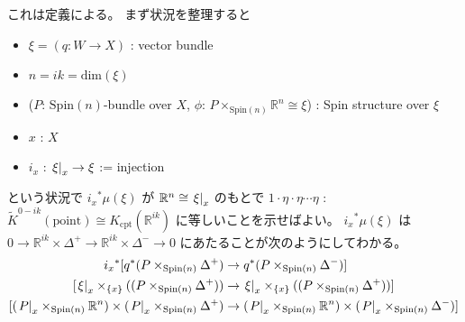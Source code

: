 \documentclass[dvipdfmx]{jsarticle}
\newcommand{\KtheoryCpxRel}[2]{K_{\mathbb{K},cpt}(#1, #2)}
\begin{document}
\begin{Proof}
\itemprof
  これは定義による。
\itemprof
  まず状況を整理すると
  \begin{itemize}
    \item \(\xi = (q : W \to X)\) : vector bundle
    \item \(n = ik = \text{dim}(\xi)\)
    \item (\(P\): \(\text{Spin}(n)\)-bundle over \(X\), \(\phi\): \(P \times_{\text{Spin}(n)} \mathbb{R}^n \cong \xi\)) : Spin structure over \(\xi\)
    \item \(x\) : \(X\)
    \item \(i_x\) : \(\left. {\xi} \right| _{x} \to \xi\) := injection
  \end{itemize}
  という状況で
  \({i_x}^*\mu(\xi)\) が \(\mathbb{R}^n \cong \left. {\xi} \right| _{x}\) のもとで \(1 \cdot \eta \cdot \eta \cdots \eta\) : \(\tilde{K}^{0 - ik}(\text{point}) \cong K_{\text{cpt}}(\mathbb{R}^{ik})\)
  に等しいことを示せばよい。
  \({i_x}^*\mu(\xi)\) は　\(0 \to \mathbb{R}^{ik} \times \Delta^+ \to \mathbb{R}^{ik} \times \Delta^- \to 0\) にあたることが次のようにしてわかる。
  \begin{align*}
    {i_x}^*[q^* (P \times_{\text{Spin}(n)} \Delta^+) &\to q^* (P \times_{\text{Spin}(n)} \Delta^-)] \\
    [\restr{\xi}{x} \times_{\{x\}} ((P \times_{\text{Spin}(n)} \Delta^+)) &\to \restr{\xi}{x} \times_{\{x\}} ((P \times_{\text{Spin}(n)} \Delta^+))] \\
    [(\restr{P}{x} \times_{\text{Spin}(n)} \mathbb{R}^n) \times (\restr{P}{x} \times_{\text{Spin}(n)} \Delta^+) &\to (\restr{P}{x} \times_{\text{Spin}(n)} \mathbb{R}^n) \times (\restr{P}{x} \times_{\text{Spin}(n)} \Delta^-)] \\

\end{align*}
\end{Proof}
\end{document}
